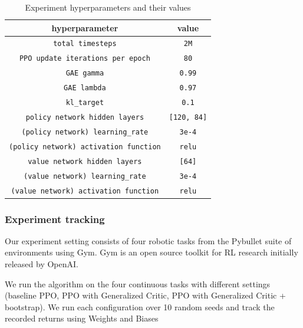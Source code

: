 \begin{table}
  \begin{center}
    \begin{tabular}{cc}
      \hline 
      hyperparameter & value \\ 
      \hline 
      \verb!total timesteps! & \verb!2M! \\
      \verb!PPO update iterations per epoch! &  \verb!80! \\
      \verb!GAE gamma! & \verb!0.99! \\
      \verb!GAE lambda! & \verb!0.97! \\
      \verb!kl_target! & \verb!0.1! \\
      \verb!policy network hidden layers! & \verb![120, 84]! \\
      \verb!(policy network) learning_rate! & \verb!3e-4! \\
      \verb!(policy network) activation function! & \verb!relu!\\
      \verb!value network hidden layers! & \verb![64]! \\
      \verb!(value network) learning_rate! & \verb!3e-4! \\
      \verb!(value network) activation function! & \verb!relu! \\
      \hline      
    \end{tabular}
  \end{center}
  \caption{Experiment hyperparameters and their values}
  \label{hyperparameters}
\end{table}




\subsubsection{Experiment tracking}

Our experiment setting consists of four robotic tasks from the Pybullet suite of environments using Gym. Gym\cite{brockman2016openai} is an open source toolkit for RL research initially released by OpenAI. 

We run the algorithm on the four continuous tasks with different settings (baseline PPO, PPO with Generalized Critic, PPO with Generalized Critic + bootstrap). We run each configuration over 10 random seeds and track the recorded returns using Weights and Biases\cite{wandb} 




